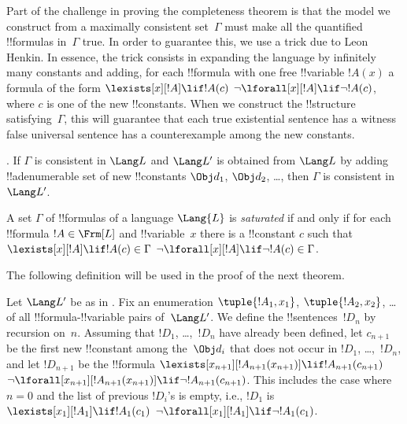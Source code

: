\documentclass[../../include/open-logic-section]{subfiles}
\begin{document}


\begin{explain}
Part of the challenge in proving the completeness theorem is that the
model we construct from a maximally consistent set~$\Gamma$ must make
all the quantified !!{formula}s in~$\Gamma$ true.  In order to
guarantee this, we use a trick due to Leon Henkin.  In essence, the
trick consists in expanding the language by infinitely many constants
and adding, for each !!{formula} with one free !!{variable} $!A(x)$ a
formula of the form 
      {$\lexists[x][!A] \lif !A(c)$}
      {$\lnot\lforall[x][!A] \lif \lnot !A(c)$},
where $c$ is one of the new !!{constant}s.  When we construct the
!!{structure} satisfying~$\Gamma$, this will guarantee that each
{true existential sentence has a witness}
{false universal sentence has a counterexample}
among the new constants.
\end{explain}

\begin{lem}
.
If $\Gamma$ is consistent in $\Lang L$ and $\Lang L'$ is obtained from
$\Lang L$ by adding !!a{denumerable} set of new !!{constant}s $\Obj d_1$,
$\Obj d_2$, \dots, then $\Gamma$ is consistent in~$\Lang L'$.
\end{lem}

\begin{defn}
A set $\Gamma$ of !!{formula}s of a language $\Lang {L}$ is
\emph{saturated} if and only if for each !!{formula} $!A \in \Frm[L]$
and !!{variable}~$x$ there is a !!{constant} $c$ such that
      {$\lexists[x][!A] \lif !A(c) \in \Gamma$}
      {$\lnot\lforall[x][!A] \lif \lnot !A(c) \in \Gamma$}.
\end{defn}

The following definition will be used in the proof of the next theorem.

\begin{defn}
Let $\Lang L'$ be as in .  Fix an enumeration
$\tuple{!A_1, x_1}$, $\tuple{!A_2, x_2}$, \dots of all
!!{formula}-!!{variable} pairs of~$\Lang L'$.  We define the
!!{sentence}s~$!D_n$ by recursion on~$n$. Assuming that $!D_1$,
\dots,~$!D_n$ have already been defined, let $c_{n+1}$ be the first
new !!{constant} among the~$\Obj d_i$ that does not occur in $!D_1$,
\dots,~$!D_n$, and let $!D_{n+1}$ be the !!{formula} 
     {$\lexists[x_{n+1}][!A_{n+1}(x_{n+1})] \lif !A_{n+1}(c_{n+1})$}
     {$\lnot\lforall[x_{n+1}][!A_{n+1}(x_{n+1})] \lif \lnot
       !A_{n+1}(c_{n+1})$}.  This includes the case where $n = 0$ and
     the list of previous $!D_i$'s is empty, i.e., $!D_1$ is
      {$\lexists[x_1][!A_1] \lif !A_1(c_1)$}
           {$\lnot\lforall[x_1][!A_1] \lif \lnot !A_1(c_1)$}.
\end{defn}
\end{document}
